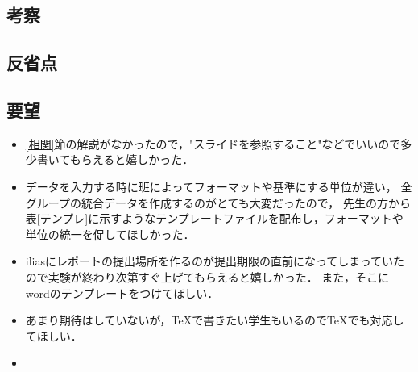 \documentclass[titlepage,a4paper]{jsarticle}
\begin{document}
\subsection{考察}
\subsection{反省点}

\subsection{要望}
\begin{itemize}
  \item \ref{相関}節の解説がなかったので，"スライドを参照すること"などでいいので多少書いてもらえると嬉しかった．
  \item データを入力する時に班によってフォーマットや基準にする単位が違い，
        全グループの統合データを作成するのがとても大変だったので，
        先生の方から表\ref{テンプレ}に示すようなテンプレートファイルを配布し，フォーマットや単位の統一を促してほしかった．
  \item iliasにレポートの提出場所を作るのが提出期限の直前になってしまっていたので実験が終わり次第すぐ上げてもらえると嬉しかった．
        また，そこにwordのテンプレートをつけてほしい．
  \item あまり期待はしていないが，TeXで書きたい学生もいるのでTeXでも対応してほしい．
  \item
\end{itemize}
\end{document}
